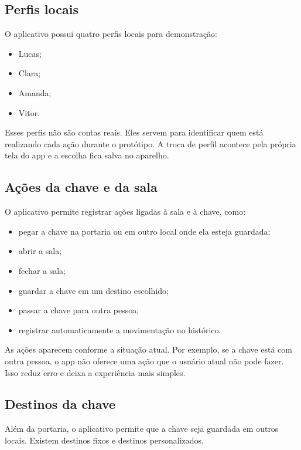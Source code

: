 \documentclass[12pt,a4paper]{article}
\begin{document}
\subsection{Perfis locais}

O aplicativo possui quatro perfis locais para demonstração:

\begin{itemize}
    \item Lucas;
    \item Clara;
    \item Amanda;
    \item Vitor.
\end{itemize}

Esses perfis não são contas reais. Eles servem para identificar quem está realizando cada ação durante o protótipo. A troca de perfil acontece pela própria tela do app e a escolha fica salva no aparelho.

\subsection{Ações da chave e da sala}

O aplicativo permite registrar ações ligadas à sala e à chave, como:

\begin{itemize}
    \item pegar a chave na portaria ou em outro local onde ela esteja guardada;
    \item abrir a sala;
    \item fechar a sala;
    \item guardar a chave em um destino escolhido;
    \item passar a chave para outra pessoa;
    \item registrar automaticamente a movimentação no histórico.
\end{itemize}

As ações aparecem conforme a situação atual. Por exemplo, se a chave está com outra pessoa, o app não oferece uma ação que o usuário atual não pode fazer. Isso reduz erro e deixa a experiência mais simples.

\subsection{Destinos da chave}

Além da portaria, o aplicativo permite que a chave seja guardada em outros locais. Existem destinos fixos e destinos personalizados.
\end{document}
